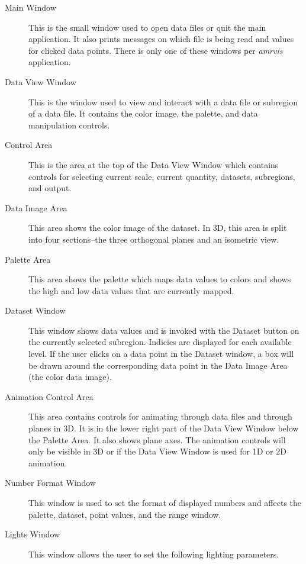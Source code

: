 \documentclass{article}
\begin{document}
\begin{description}
\item[Main Window]  This is the small window used to open data files
or quit the main application.  It also prints messages on which file
is being read and values for clicked data points.  There is only one
of these windows per {\em amrvis} application.

\item[Data View Window]  This is the window used to view and interact
with a data file or subregion of a data file.  It contains the color image,
the palette, and data manipulation controls.

\item[Control Area]  This is the area at the top of the Data View Window
which contains controls for selecting current scale, current quantity,
datasets, subregions, and output.

\item[Data Image Area]  This area shows the color image of the dataset.
In 3D, this area is split into four sections--the three orthogonal
planes and an isometric view.

\item[Palette Area]  This area shows the palette which maps data values
to colors and shows the high and low data values that are currently mapped.

\item[Dataset Window]  This window shows data values and is invoked
with the Dataset button on the currently selected subregion.
Indicies are displayed for each available level.  If the user
clicks on a data point in the Dataset window, a box will be
drawn around the corresponding data point in the Data Image Area
(the color data image).

\item[Animation Control Area]  This area contains controls for animating
through data files and through planes in 3D.  It is in the lower right
part of the Data View Window below the Palette Area.  It also shows
plane axes.  The animation controls will only be visible in 3D or
if the Data View Window is used for 1D or 2D animation.

\item[Number Format Window]  This window is used to set the
format of displayed numbers and affects the palette, dataset,
point values, and the range window.

\item[Lights Window] This window allows the user to set the following
lighting parameters.


\end{description}
\end{document}
